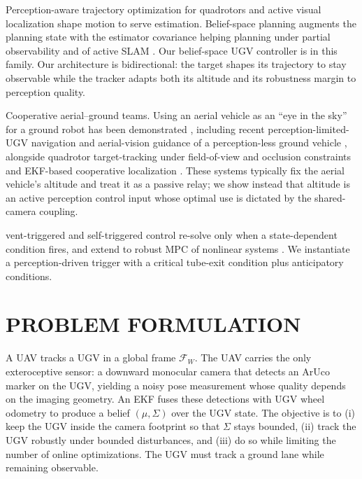 \documentclass[letterpaper, 10 pt, conference]{ieeeconf}  %
\begin{document}
 Perception-aware trajectory optimization for
quadrotors \cite{falanga2018pampc,spasojevic2020perception} and active visual localization
\cite{zhang2019fisher} shape motion to serve estimation. Belief-space planning
\cite{platt2010belief,vandenberg2012motion,prentice2009belief,indelman2015planning} augments
the planning state with the estimator covariance helping planning under partial
observability \cite{kaelbling1998planning} and of active SLAM \cite{cadena2016past,placed2023survey}.
Our belief-space UGV controller is in this family. Our architecture is
{bidirectional}: the {target} shapes its trajectory to stay observable while the
{tracker} adapts both its altitude and its robustness margin to perception quality.

 {Cooperative aerial--ground teams.} Using an aerial vehicle as an ``eye in the sky'' for
a ground robot has been demonstrated \cite{grocholsky2006cooperative}, including recent
perception-limited-UGV navigation \cite{li2024colag} and aerial-vision guidance of a
perception-less ground vehicle \cite{santos2024aerial}, alongside quadrotor target-tracking
under field-of-view and occlusion constraints \cite{thomas2017autonomous,penin2018vision} and
EKF-based cooperative localization \cite{roumeliotis2002distributed,kia2016cooperative}. These
systems typically fix the aerial vehicle's altitude and treat it as a passive relay; we show
instead that altitude is an active perception control input whose optimal use is dictated by
the shared-camera coupling.

 vent-triggered and self-triggered control
\cite{tabuada2007event,heemels2012introduction} re-solve only when a state-dependent condition
fires, and extend to robust MPC of nonlinear systems \cite{eqtami2010event,li2014event}. We
instantiate a perception-driven trigger with a critical tube-exit condition plus anticipatory
conditions.

\section{PROBLEM FORMULATION}
\label{sec:problem}

A UAV tracks a UGV in a global frame $\mathcal{F}_W$. The UAV carries the only
exteroceptive sensor: a downward monocular camera that detects an ArUco marker on
the UGV, yielding a noisy pose measurement whose quality depends on the imaging
geometry. An EKF fuses these detections with UGV wheel odometry to produce a
belief $(\mu,\Sigma)$ over the UGV state. The objective is to (i) keep the UGV
inside the camera footprint so that $\Sigma$ stays bounded, (ii) track the UGV
robustly under bounded disturbances, and (iii) do so while limiting the number of
online optimizations. The UGV must track a ground lane while remaining
observable.
\end{document}

